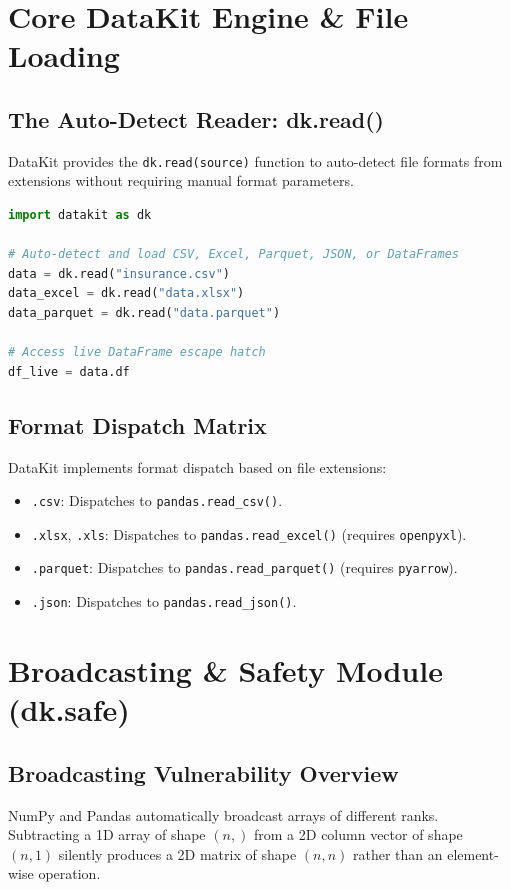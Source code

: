 \documentclass[11pt,a4paper,oneside]{book}
\begin{document}
\chapter{Core DataKit Engine \& File Loading}

\section{The Auto-Detect Reader: dk.read()}
DataKit provides the \texttt{dk.read(source)} function to auto-detect file formats from extensions without requiring manual format parameters.

\begin{lstlisting}[language=python]
import datakit as dk

# Auto-detect and load CSV, Excel, Parquet, JSON, or DataFrames
data = dk.read("insurance.csv")
data_excel = dk.read("data.xlsx")
data_parquet = dk.read("data.parquet")

# Access live DataFrame escape hatch
df_live = data.df
\end{lstlisting}

\section{Format Dispatch Matrix}
DataKit implements format dispatch based on file extensions:
\begin{itemize}
    \item \texttt{.csv}: Dispatches to \texttt{pandas.read\_csv()}.
    \item \texttt{.xlsx}, \texttt{.xls}: Dispatches to \texttt{pandas.read\_excel()} (requires \texttt{openpyxl}).
    \item \texttt{.parquet}: Dispatches to \texttt{pandas.read\_parquet()} (requires \texttt{pyarrow}).
    \item \texttt{.json}: Dispatches to \texttt{pandas.read\_json()}.
\end{itemize}

\chapter{Broadcasting \& Safety Module (dk.safe)}

\section{Broadcasting Vulnerability Overview}
NumPy and Pandas automatically broadcast arrays of different ranks. Subtracting a 1D array of shape $(n,)$ from a 2D column vector of shape $(n, 1)$ silently produces a 2D matrix of shape $(n, n)$ rather than an element-wise operation.
\end{document}
